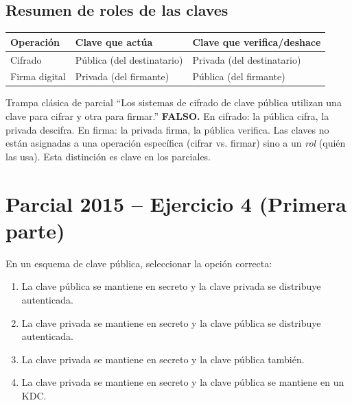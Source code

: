 \documentclass[11pt,a4paper]{article}
\begin{document}
\subsection{Resumen de roles de las claves}

\begin{center}
\renewcommand{\arraystretch}{1.4}
\begin{tabular}{lll}
\toprule
\textbf{Operación} & \textbf{Clave que actúa} & \textbf{Clave que verifica/deshace} \\
\midrule
Cifrado & Pública (del destinatario) & Privada (del destinatario) \\
Firma digital & Privada (del firmante) & Pública (del firmante) \\
\bottomrule
\end{tabular}
\end{center}

\begin{warnbox}{Trampa clásica de parcial}
``Los sistemas de cifrado de clave pública utilizan una clave para cifrar y otra para firmar.'' \textbf{FALSO.} En cifrado: la pública cifra, la privada descifra. En firma: la privada firma, la pública verifica. Las claves no están asignadas a una operación específica (cifrar vs. firmar) sino a un \emph{rol} (quién las usa). Esta distinción es clave en los parciales.
\end{warnbox}

\section{Parcial 2015 -- Ejercicio 4 (Primera parte)}
\label{sec:rsa2015a}

\begin{consignabox}
En un esquema de clave pública, seleccionar la opción correcta:
\begin{enumerate}[label=(\alph*)]
  \item La clave pública se mantiene en secreto y la clave privada se distribuye autenticada.
  \item La clave privada se mantiene en secreto y la clave pública se distribuye autenticada.
  \item La clave privada se mantiene en secreto y la clave pública también.
  \item La clave privada se mantiene en secreto y la clave pública se mantiene en un KDC.
\end{enumerate}
\end{consignabox}
\end{document}
